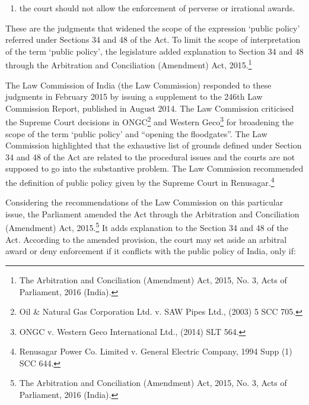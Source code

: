 \begin{multicols}{2}
\begin{enumerate}[label=$\alph*)$]
\item the court should not allow the enforcement of perverse or irrational awards.
\end{enumerate}

\vspace{-.5cm}

\noi
These are the judgments that widened the scope of the expression ‘public policy’ referred
under Sections 34 and 48 of the Act. To limit the scope of interpretation of the term ‘public
policy’, the legislature added explanation to Section 34 and 48 through the Arbitration and
Conciliation (Amendment) Act, 2015.\footnote{The Arbitration and Conciliation (Amendment) Act, 2015, No. 3, Acts of Parliament, 2016 (India).}

\vspace{-.1cm}


\vspace{-.1cm}

\noi
The Law Commission of India (the Law Commission) responded to these judgments in
February 2015 by issuing a supplement to the 246th Law Commission Report, published in
August 2014. The Law Commission criticised the Supreme Court decisions in ONGC\footnote{Oil \& Natural Gas Corporation Ltd. v. SAW Pipes Ltd., (2003) 5 SCC 705.} and
Western Geco\footnote{ONGC v. Western Geco International Ltd., (2014) SLT 564.} for broadening the scope of the term ‘public policy’ and “opening the floodgates”. The Law Commission highlighted that the exhaustive list of grounds defined
under Section 34 and 48 of the Act are related to the procedural issues and the courts are not
supposed to go into the substantive problem. The Law Commission recommended the
definition of public policy given by the Supreme Court in Renusagar.\footnote{Renusagar Power Co. Limited v. General Electric Company, 1994 Supp (1) SCC 644.}

\noi
Considering the recommendations of the Law Commission on this particular issue, the
Parliament amended the Act through the Arbitration and Conciliation (Amendment) Act,
2015.\footnote{The Arbitration and Conciliation (Amendment) Act, 2015, No. 3, Acts of Parliament, 2016 (India).} It adds explanation to the Section 34 and 48 of the Act. According to the amended
provision, the court may set aside an arbitral award or deny enforcement if it conflicts with
the public policy of India, only if:


\newpage


\end{multicols}
